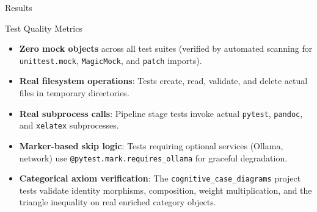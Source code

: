 \documentclass[
  ignorenonframetext,
]{beamer}
\providecommand{\tightlist}{%
  \setlength{\itemsep}{0pt}\setlength{\parskip}{0pt}}
\begin{document}
\begin{frame}[fragile]{Results}
\begin{block}{Test Quality Metrics}
\begin{itemize}
\tightlist
\item
  \textbf{Zero mock objects} across all test suites (verified by
  automated scanning for \texttt{unittest.mock}, \texttt{MagicMock}, and
  \texttt{patch} imports).
\item
  \textbf{Real filesystem operations}: Tests create, read, validate, and
  delete actual files in temporary directories.
\item
  \textbf{Real subprocess calls}: Pipeline stage tests invoke actual
  \texttt{pytest}, \texttt{pandoc}, and \texttt{xelatex} subprocesses.
\item
  \textbf{Marker-based skip logic}: Tests requiring optional services
  (Ollama, network) use \texttt{@pytest.mark.requires\_ollama} for
  graceful degradation.
\item
  \textbf{Categorical axiom verification}: The
  \texttt{cognitive\_case\_diagrams} project tests validate identity
  morphisms, composition, weight multiplication, and the triangle
  inequality on real enriched category objects.
\end{itemize}
\end{block}
\end{frame}
\end{document}

